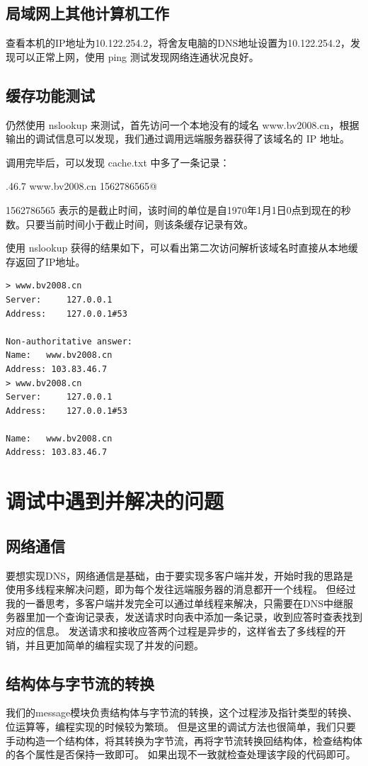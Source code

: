 \documentclass[]{article}
\begin{document}
    \subsection{局域网上其他计算机工作}
        查看本机的IP地址为10.122.254.2，将舍友电脑的DNS地址设置为10.122.254.2，发现可以正常上网，使用 ping 测试发现网络连通状况良好。

    \subsection{缓存功能测试}
        仍然使用 nslookup 来测试，首先访问一个本地没有的域名 www.bv2008.cn，根据输出的调试信息可以发现，我们通过调用远端服务器获得了该域名的 IP 地址。

        调用完毕后，可以发现 cache.txt 中多了一条记录：
        
        .46.7 www.bv2008.cn 1562786565@

        1562786565 表示的是截止时间，该时间的单位是自1970年1月1日0点到现在的秒数。只要当前时间小于截止时间，则该条缓存记录有效。

        使用 nslookup 获得的结果如下，可以看出第二次访问解析该域名时直接从本地缓存返回了IP地址。

        \begin{lstlisting}
> www.bv2008.cn
Server:		127.0.0.1
Address:	127.0.0.1#53

Non-authoritative answer:
Name:	www.bv2008.cn
Address: 103.83.46.7
> www.bv2008.cn
Server:		127.0.0.1
Address:	127.0.0.1#53

Name:	www.bv2008.cn
Address: 103.83.46.7
        \end{lstlisting}

\section{调试中遇到并解决的问题}
    \subsection{网络通信}
        要想实现DNS，网络通信是基础，由于要实现多客户端并发，开始时我的思路是使用多线程来解决问题，即为每个发往远端服务器的消息都开一个线程。
        但经过我的一番思考，多客户端并发完全可以通过单线程来解决，只需要在DNS中继服务器里加一个查询记录表，发送请求时向表中添加一条记录，收到应答时查表找到对应的信息。
        发送请求和接收应答两个过程是异步的，这样省去了多线程的开销，并且更加简单的编程实现了并发的问题。
    \subsection{结构体与字节流的转换}
        我们的message模块负责结构体与字节流的转换，这个过程涉及指针类型的转换、位运算等，编程实现的时候较为繁琐。
        但是这里的调试方法也很简单，我们只要手动构造一个结构体，将其转换为字节流，再将字节流转换回结构体，检查结构体的各个属性是否保持一致即可。
        如果出现不一致就检查处理该字段的代码即可。
\end{document}
